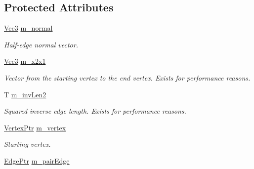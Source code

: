 \subsection*{Protected Attributes}
\begin{DoxyCompactItemize}
\item 
\hyperlink{classDcel_1_1EdgeT_a93b8679cea557c419af44385ca6d356a}{Vec3} \hyperlink{classDcel_1_1EdgeT_af44c33f8b5b0a3d45cd4a83e6fde4db5}{m\+\_\+normal}
\begin{DoxyCompactList}\small\item\em Half-\/edge normal vector. \end{DoxyCompactList}\item 
\mbox{\label{classDcel_1_1EdgeT_af70e7b85effe62dd804638984b15695a}} 
\hyperlink{classDcel_1_1EdgeT_a93b8679cea557c419af44385ca6d356a}{Vec3} \hyperlink{classDcel_1_1EdgeT_af70e7b85effe62dd804638984b15695a}{m\+\_\+x2x1}
\begin{DoxyCompactList}\small\item\em Vector from the starting vertex to the end vertex. Exists for performance reasons. \end{DoxyCompactList}\item 
\mbox{\label{classDcel_1_1EdgeT_a3689615754e3bdafb12109d5b82183a7}} 
T \hyperlink{classDcel_1_1EdgeT_a3689615754e3bdafb12109d5b82183a7}{m\+\_\+inv\+Len2}
\begin{DoxyCompactList}\small\item\em Squared inverse edge length. Exists for performance reasons. \end{DoxyCompactList}\item 
\mbox{\label{classDcel_1_1EdgeT_a30813ecada33723cc466e0cd1d24abd4}} 
\hyperlink{classDcel_1_1EdgeT_ab4ba57cfc6b2f90da43096eea87bb284}{Vertex\+Ptr} \hyperlink{classDcel_1_1EdgeT_a30813ecada33723cc466e0cd1d24abd4}{m\+\_\+vertex}
\begin{DoxyCompactList}\small\item\em Starting vertex. \end{DoxyCompactList}\item 
\mbox{\label{classDcel_1_1EdgeT_a5c3bc15e1360b931231cac396493f5b6}} 
\hyperlink{classDcel_1_1EdgeT_af525f4228d820f6b8b23fc02d937e4c8}{Edge\+Ptr} \hyperlink{classDcel_1_1EdgeT_a5c3bc15e1360b931231cac396493f5b6}{m\+\_\+pair\+Edge}

\end{DoxyCompactItemize}
